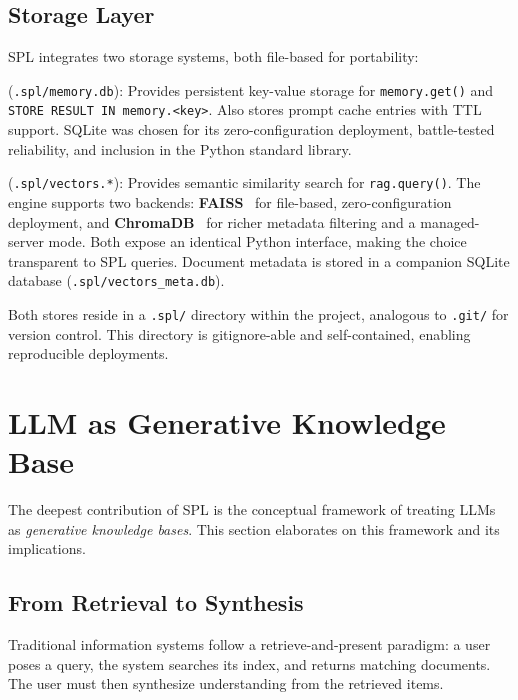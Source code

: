 \documentclass[11pt,a4paper]{article}
\begin{document}
\subsection{Storage Layer}

SPL integrates two storage systems, both file-based for portability:

\begin{description}[nosep]
  \item[SQLite Memory Store] (\texttt{.spl/memory.db}): Provides persistent key-value storage for \texttt{memory.get()} and \texttt{STORE RESULT IN memory.<key>}. Also stores prompt cache entries with TTL support. SQLite was chosen for its zero-configuration deployment, battle-tested reliability, and inclusion in the Python standard library.
  \item[Vector Store] (\texttt{.spl/vectors.*}): Provides semantic similarity search for \texttt{rag.query()}. The engine supports two backends: \textbf{FAISS}~\citep{johnson2019billion} for file-based, zero-configuration deployment, and \textbf{ChromaDB}~\citep{chromadb2023} for richer metadata filtering and a managed-server mode. Both expose an identical Python interface, making the choice transparent to SPL queries. Document metadata is stored in a companion SQLite database (\texttt{.spl/vectors\_meta.db}).
\end{description}

Both stores reside in a \texttt{.spl/} directory within the project, analogous to \texttt{.git/} for version control. This directory is gitignore-able and self-contained, enabling reproducible deployments.

\section{LLM as Generative Knowledge Base}
\label{sec:generative-kb}

The deepest contribution of SPL is the conceptual framework of treating LLMs as \emph{generative knowledge bases}. This section elaborates on this framework and its implications.

\subsection{From Retrieval to Synthesis}

Traditional information systems follow a retrieve-and-present paradigm: a user poses a query, the system searches its index, and returns matching documents. The user must then synthesize understanding from the retrieved items.
\end{document}
